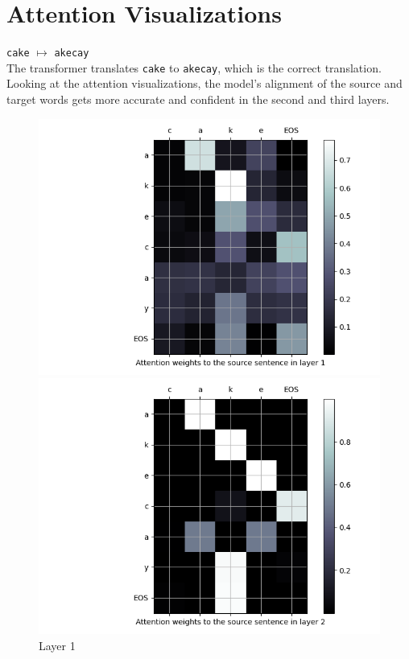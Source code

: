 \section{Attention Visualizations}

\begin{enumarabic}
  \item \verb|cake| $\mapsto$ \verb|akecay| \\
    The transformer translates \verb|cake| to \verb|akecay|, which is the correct translation.
    Looking at the attention visualizations, the model's alignment of the source
    and target words gets more accurate and confident in the second and third layers.

    \begin{figure}[H]
      \centering
      \begin{minipage}[b]{0.33\textwidth}
        \centering
        \includegraphics[width=\textwidth]{figures/cake-0.png}
        \caption{Layer 1}
        \label{fig:cake-0}
      \end{minipage}
      \hfill
      \begin{minipage}[b]{0.33\textwidth}
        \centering
        \includegraphics[width=\textwidth]{figures/cake-1.png}

\end{minipage}
\end{figure}
\end{enumarabic}
